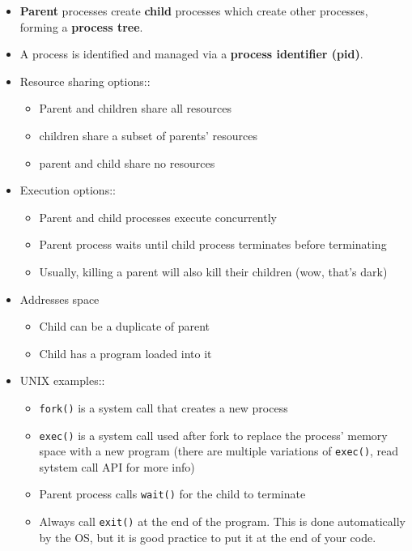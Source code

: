 \documentclass[12pt]{book}
\begin{document}
\begin{itemize}
    \item \textbf{Parent} processes create \textbf{child} processes which create other processes, forming a \textbf{process tree}.
    \item A process is identified and managed via a \textbf{process identifier (pid)}.
    \item Resource sharing options::
    \begin{itemize}
        \item Parent and children share all resources
        \item children share a subset of parents' resources
        \item parent and child share no resources
    \end{itemize} 
    \item Execution options::
    \begin{itemize}
        \item Parent and child processes execute concurrently
        \item Parent process waits until child process terminates before terminating
        \item Usually, killing a parent will also kill their children (wow, that's dark)
    \end{itemize} 
    \item Addresses space
    \begin{itemize}
        \item Child can be a duplicate of parent
        \item Child has a program loaded into it
    \end{itemize} 

    \item UNIX examples::
    \begin{itemize}
        \item \texttt{fork()} is a system call that creates a new process
        \item \texttt{exec()} is a system call used after fork to replace the process' memory space with a new program (there are multiple variations of \texttt{exec()}, read sytstem call API for more info)
        \item Parent process calls \texttt{wait()} for the child to terminate
        \item Always call \texttt{exit()} at the end of the program. This is done automatically by the OS, but it is good practice to put it at the end of your code.
    \end{itemize}
\end{itemize}
\end{document}
